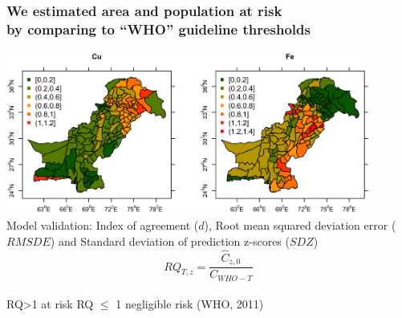 \documentclass[10pt, compress]{beamer}
\begin{document}



\begin{frame}[fragile]
  \frametitle{We estimated area and population at risk \protect\\ by comparing to ``WHO'' guideline thresholds}
  \centering
  \includegraphics[width=0.9\textwidth]{images/Prediction_example.png}\\
  Model validation: \small \alert{Index of agreement ($d$)}, \alert{Root mean squared deviation error ($RMSDE$)} and \alert{Standard deviation of prediction z-scores ($SDZ$)}\\
  \pause \vspace{-0.3cm} \normalsize
  \begin{equation*}
    RQ_{T,z} = \frac{\hat{C}_{z,0}}{C_{WHO-T}}
    \end{equation*}\\
  \alert{RQ>1} at risk \alert{RQ $\leq$ 1} negligible risk \footnotesize{(WHO, 2011)}
\end{frame}

\end{document}
